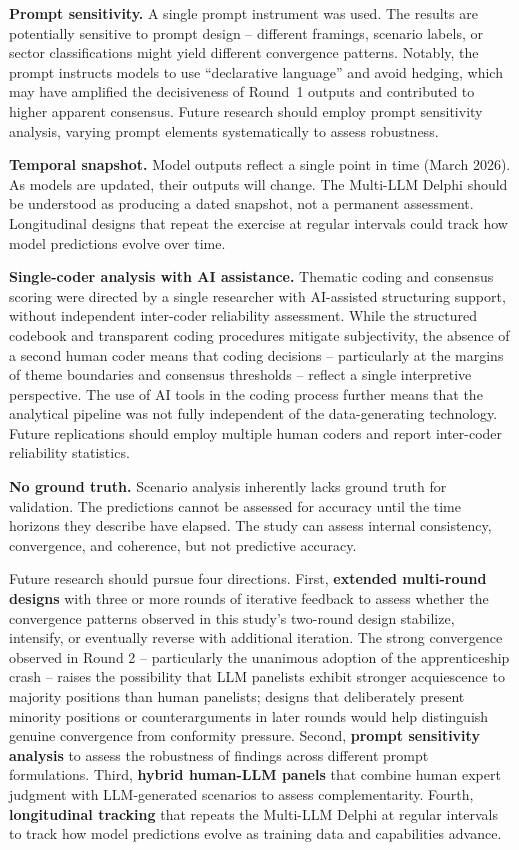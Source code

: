 \documentclass[preprint,review,12pt]{elsarticle}
\begin{document}
\textbf{Prompt sensitivity.} A single prompt instrument was used. The results are potentially sensitive to prompt design -- different framings, scenario labels, or sector classifications might yield different convergence patterns. Notably, the prompt instructs models to use ``declarative language'' and avoid hedging, which may have amplified the decisiveness of Round~1 outputs and contributed to higher apparent consensus. Future research should employ prompt sensitivity analysis, varying prompt elements systematically to assess robustness.

\textbf{Temporal snapshot.} Model outputs reflect a single point in time (March 2026). As models are updated, their outputs will change. The Multi-LLM Delphi should be understood as producing a dated snapshot, not a permanent assessment. Longitudinal designs that repeat the exercise at regular intervals could track how model predictions evolve over time.

\textbf{Single-coder analysis with AI assistance.} Thematic coding and consensus scoring were directed by a single researcher with AI-assisted structuring support, without independent inter-coder reliability assessment. While the structured codebook and transparent coding procedures mitigate subjectivity, the absence of a second human coder means that coding decisions -- particularly at the margins of theme boundaries and consensus thresholds -- reflect a single interpretive perspective. The use of AI tools in the coding process further means that the analytical pipeline was not fully independent of the data-generating technology. Future replications should employ multiple human coders and report inter-coder reliability statistics.

\textbf{No ground truth.} Scenario analysis inherently lacks ground truth for validation. The predictions cannot be assessed for accuracy until the time horizons they describe have elapsed. The study can assess internal consistency, convergence, and coherence, but not predictive accuracy.

Future research should pursue four directions. First, \textbf{extended multi-round designs} with three or more rounds of iterative feedback to assess whether the convergence patterns observed in this study's two-round design stabilize, intensify, or eventually reverse with additional iteration. The strong convergence observed in Round 2 -- particularly the unanimous adoption of the apprenticeship crash -- raises the possibility that LLM panelists exhibit stronger acquiescence to majority positions than human panelists; designs that deliberately present minority positions or counterarguments in later rounds would help distinguish genuine convergence from conformity pressure. Second, \textbf{prompt sensitivity analysis} to assess the robustness of findings across different prompt formulations. Third, \textbf{hybrid human-LLM panels} that combine human expert judgment with LLM-generated scenarios to assess complementarity. Fourth, \textbf{longitudinal tracking} that repeats the Multi-LLM Delphi at regular intervals to track how model predictions evolve as training data and capabilities advance.
\end{document}
